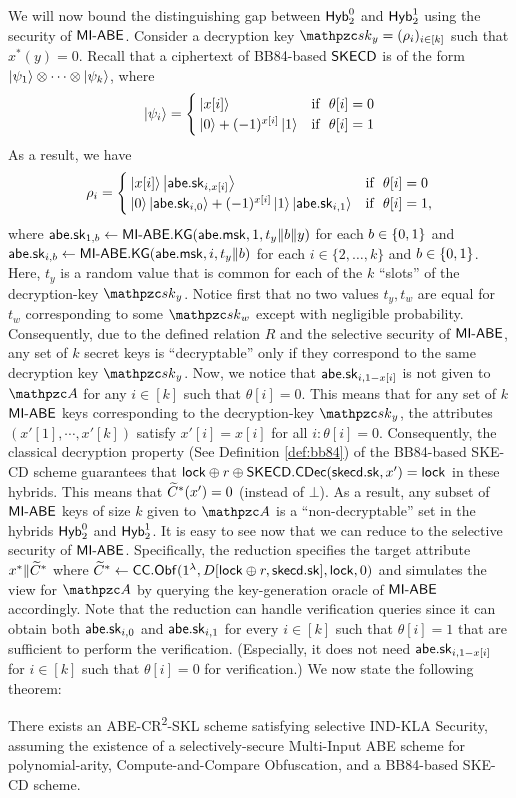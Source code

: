 We will now bound the distinguishing gap between $\mathsf{Hyb}_{2}^0$ and
$\mathsf{Hyb}_{2}^1$ using the security of $\mathsf{MI}\textrm{-}\mathsf{ABE}$. Consider a
decryption key $\qsk_y = (\rho_i)_{i\in[k]}$ such that $x^*(y) = 0$. Recall that a ciphertext of BB84-based $\mathsf{SKECD}$ is of the form
$\ket{\psi_1}\otimes\cdots \otimes\ket{\psi_k}$, where
    \begin{align}
    \ket{\psi_i}=
    \begin{cases}
        \ket{x[i]} & \textrm{if}~~ \theta[i]=0\\
        \ket{0}+(-1)^{x[i]}\ket{1} & \textrm{if}~~ \theta[i]=1
    \end{cases}
    \end{align}
As a result, we have
    \begin{align}
    \rho_i=
    \begin{cases}
        \ket{x[i]}\ket{\mathsf{abe}.\mathsf{sk}_{i,x[i]}} & \textrm{if}~~ \theta[i]=0\\
        \ket{0}\ket{\mathsf{abe}.\mathsf{sk}_{i,0}}+(-1)^{x[i]}\ket{1}\ket{\mathsf{abe}.\mathsf{sk}_{i,1}} & \textrm{if}~~ \theta[i]=1,
    \end{cases}
    \end{align}
where $\mathsf{abe}.\mathsf{sk}_{1,b}\leftarrow\mathsf{MI}\textrm{-}\mathsf{ABE}.\mathsf{KG}(\mathsf{abe}.\mathsf{msk},1,t_y\|b\|y)$ for each
$b \in \{0,1\}$ and
$\mathsf{abe}.\mathsf{sk}_{i,b}\leftarrow\mathsf{MI}\textrm{-}\mathsf{ABE}.\mathsf{KG}(\mathsf{abe}.\mathsf{msk},i,\allowbreak t_y\|b)$
for each $i \in \{2, \ldots, k\}$ and $b \in \{0,1\}$. Here, $t_y$ is a
random value that is common for each of the $k$ ``slots'' of the
decryption-key $\qsk_y$. Notice first that no
two values $t_y, t_w$ are equal for $t_w$ corresponding to some
$\qsk_w$ except with negligible probability.
Consequently, due to the defined relation $R$ and the selective
security of $\mathsf{MI}\textrm{-}\mathsf{ABE}$, any set of $k$ secret keys is ``decryptable'' only if
they correspond to the same decryption key $\qsk_y$. Now, we notice
that $\mathsf{abe}.\mathsf{sk}_{i,1-x[i]}$ is not given to $\qA$ for any $i\in[k]$
such that $\theta[i]=0$. This means that for any set of $k$ $\mathsf{MI}\textrm{-}\mathsf{ABE}$
keys corresponding to the decryption-key $\qsk_y$, the attributes
$(x'[1], \cdots, x'[k])$ satisfy $x'[i] = x[i]$ for all $i:\theta[i] =
0$. Consequently, the classical decryption property (See Definition
\ref{def:bb84}) of the BB84-based SKE-CD scheme guarantees that $\mathsf{lock}
\oplus r \oplus \mathsf{SKECD}.\mathsf{CDec}(\mathsf{skecd}.\mathsf{sk}, x') = \mathsf{lock}$ in these hybrids. This means that
$\widetilde{C}^*(x') = 0$ (instead of $\bot$).  As a result, any subset of
$\mathsf{MI}\textrm{-}\mathsf{ABE}$ keys of size $k$ given to $\qA$ is a ``non-decryptable'' set
in the hybrids $\mathsf{Hyb}_2^0$ and $\mathsf{Hyb}_2^1$.
It is easy to see now that we can reduce to the selective security of
$\mathsf{MI}\textrm{-}\mathsf{ABE}$. Specifically, the reduction specifies the target attribute
$x^* \| \widetilde{C}^*$ where
$\widetilde{C}^* \leftarrow \mathsf{CC}.\mathsf{Obf}(1^\lambda, D[\mathsf{lock}\oplus r, \mathsf{skecd}.\mathsf{sk}], \mathsf{lock}, 0)$
and simulates the view for $\qA$ by querying the key-generation oracle
of $\mathsf{MI}\textrm{-}\mathsf{ABE}$ accordingly. Note that the reduction can handle
verification queries since it can obtain both $\mathsf{abe}.\mathsf{sk}_{i,0}$ and
$\mathsf{abe}.\mathsf{sk}_{i,1}$ for every $i\in[k]$ such that $\theta[i]=1$ that are
sufficient to perform the verification.  (Especially, it does not need
$\mathsf{abe}.\mathsf{sk}_{i,1-x[i]}$ for $i\in[k]$ such that $\theta[i]=0$ for
verification.) We now state the following theorem:

\begin{theorem}
There exists an ABE-CR\textsuperscript{2}-SKL scheme satisfying
selective IND-KLA Security, assuming the existence of a
selectively-secure Multi-Input ABE scheme for polynomial-arity,
Compute-and-Compare Obfuscation, and a BB84-based SKE-CD scheme.
\end{theorem}
